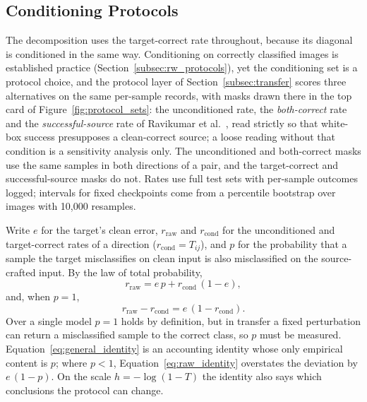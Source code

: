 \subsection{Conditioning Protocols}
\label{subsec:metrics}

The decomposition uses the target-correct rate throughout, because its diagonal is conditioned in the same way. Conditioning on correctly classified images is established practice (Section~\ref{subsec:rw_protocols}), yet the conditioning set is a protocol choice, and the protocol layer of Section~\ref{subsec:transfer} scores three alternatives on the same per-sample records, with masks drawn there in the top card of Figure~\ref{fig:protocol_sets}: the unconditioned rate, the \emph{both-correct} rate~\cite{mahmood2021robustness, ravikumar2023trend} and the \emph{successful-source} rate of Ravikumar et al.~\cite{ravikumar2023trend}, read strictly so that white-box success presupposes a clean-correct source; a loose reading without that condition is a sensitivity analysis only. The unconditioned and both-correct masks use the same samples in both directions of a pair, and the target-correct and successful-source masks do not. Rates use full test sets with per-sample outcomes logged; intervals for fixed checkpoints come from a percentile bootstrap over images with 10{,}000 resamples.

Write $e$ for the target's clean error, $r_{\text{raw}}$ and $r_{\text{cond}}$ for the unconditioned and target-correct rates of a direction ($r_{\text{cond}} = T_{ij}$), and $p$ for the probability that a sample the target misclassifies on clean input is also misclassified on the source-crafted input. By the law of total probability,
\begin{equation}
r_{\text{raw}} = e\,p + r_{\text{cond}}\,(1 - e),
\label{eq:general_identity}
\end{equation}
and, when $p=1$,
\begin{equation}
r_{\text{raw}} - r_{\text{cond}} = e\,(1 - r_{\text{cond}}).
\label{eq:raw_identity}
\end{equation}
Over a single model $p=1$ holds by definition, but in transfer a fixed perturbation can return a misclassified sample to the correct class, so $p$ must be measured. Equation~\eqref{eq:general_identity} is an accounting identity whose only empirical content is $p$; where $p<1$, Equation~\eqref{eq:raw_identity} overstates the deviation by $e\,(1-p)$. On the scale $h = -\log(1-T)$ the identity also says which conclusions the protocol can change.

